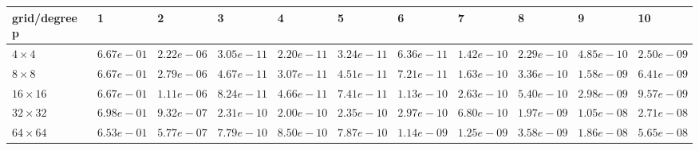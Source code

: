 \begin{tabular}{lllllllllll}
\hline
 grid/degree p   & 1          & 2          & 3          & 4          & 5          & 6          & 7          & 8          & 9          & 10         \\
\hline
 $4 \times 4$    & $6.67e-01$ & $2.22e-06$ & $3.05e-11$ & $2.20e-11$ & $3.24e-11$ & $6.36e-11$ & $1.42e-10$ & $2.29e-10$ & $4.85e-10$ & $2.50e-09$ \\
 $8 \times 8$    & $6.67e-01$ & $2.79e-06$ & $4.67e-11$ & $3.07e-11$ & $4.51e-11$ & $7.21e-11$ & $1.63e-10$ & $3.36e-10$ & $1.58e-09$ & $6.41e-09$ \\
 $16 \times 16$  & $6.67e-01$ & $1.11e-06$ & $8.24e-11$ & $4.66e-11$ & $7.41e-11$ & $1.13e-10$ & $2.63e-10$ & $5.40e-10$ & $2.98e-09$ & $9.57e-09$ \\
 $32 \times 32$  & $6.98e-01$ & $9.32e-07$ & $2.31e-10$ & $2.00e-10$ & $2.35e-10$ & $2.97e-10$ & $6.80e-10$ & $1.97e-09$ & $1.05e-08$ & $2.71e-08$ \\
 $64 \times 64$  & $6.53e-01$ & $5.77e-07$ & $7.79e-10$ & $8.50e-10$ & $7.87e-10$ & $1.14e-09$ & $1.25e-09$ & $3.58e-09$ & $1.86e-08$ & $5.65e-08$ \\
\hline
\end{tabular}